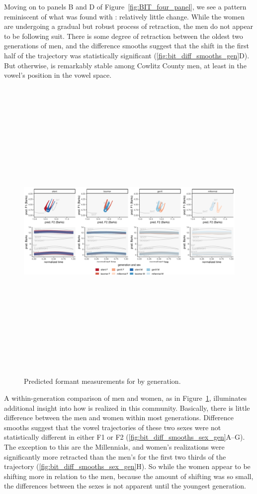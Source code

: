 Moving on to panels B and D of Figure~\ref{fig:BIT_four_panel}, we see a pattern reminiscent of what was found with \bet: relatively little change. While the women are undergoing a gradual but robust process of \bit retraction, the men do not appear to be following suit. There is some degree of retraction between the oldest two generations of men, and the difference smooths suggest that the shift in the first half of the trajectory was statistically significant (\ref{fig:bit_diff_smooths_gen}D). But otherwise, \bit is remarkably stable among Cowlitz County men, at least in the vowel's position in the vowel space.

\begin{figure}[p]
	\centering
	\includegraphics[angle = 90, origin = c, height = 6in]{Figures/BIT/BIT_sex_panel_plot_wide.pdf}
	\caption[Predicted formant measurements for \bit by generation.]{Predicted formant measurements for \bit by generation.}
	\label{fig:BIT_sex_panel_plot_wide}
\end{figure}

A within-generation comparison of men and women, as in Figure~\ref{fig:BIT_sex_panel_plot_wide}, illuminates additional insight into how \bit is realized in this community. Basically, there is little difference between the men and women within most generations. Difference smooths suggest that the vowel trajectories of these two sexes were not statistically different in either F1 or F2 (\ref{fig:bit_diff_smooths_sex_gen}A--G). The exception to this are the Millennials, and women's realizations were significantly more retracted than the men's for the first two thirds of the trajectory (\ref{fig:bit_diff_smooths_sex_gen}H). So while the women appear to be shifting more in relation to the men, because the amount of shifting was so small, the differences between the sexes is not apparent until the youngest generation.

